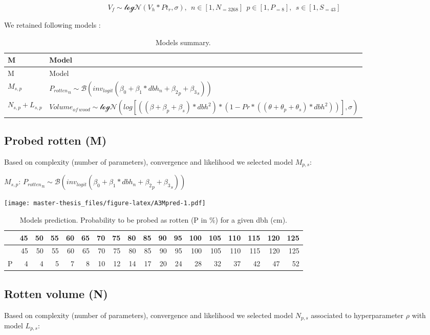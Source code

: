 \documentclass[12pt,]{article}
\theoremstyle{definition}
\theoremstyle{definition}
\theoremstyle{remark}
\begin{document}
\[V_f \sim \mathcal{logN}(V_h*Pt_r, \sigma), ~~n \in [1,N_{=3268}] ~~ p \in [1, P_{=8}], ~~ s \in [1, S_{=43}]\]

We retained following models :

\begin{longtable}[]{@{}ll@{}}
\caption{\label{tab:A3models}Models summary.}\tabularnewline
\toprule
M & Model\tabularnewline
\midrule
\endfirsthead
\toprule
M & Model\tabularnewline
\midrule
\endhead
\(M_{s,p}\) &
\({P_{rotten}}_n \sim \mathcal{B}(inv_{logit}(\beta_0 + \beta_1*dbh_n + {\beta_2}_p + {\beta_3}_s))\)\tabularnewline
\(N_{s,p} + L_{s,p}\) &
\(Volume_{of~wood} \sim \mathcal{logN} (log[((\beta + \beta_p + \beta_s)*dbh^2)*(1 - Pr*((\theta + \theta_p + \theta_s) *dbh^2))], \sigma)\)\tabularnewline
\bottomrule
\end{longtable}

\subsection{Probed rotten (M)}\label{probed-rotten-m}

Based on complexity (number of parameters), convergence and likelihood
we selected model \(M_{p,s}\):

\(M_{s,p}\):
\({P_{rotten}}_n \sim \mathcal{B}(inv_{logit}(\beta_0 + \beta_1*dbh_n + {\beta_2}_p + {\beta_3}_s))\)

\texttt{[image: master-thesis\_files/figure-latex/A3Mpred-1.pdf]}

\begin{longtable}[]{@{}lrrrrrrrrrrrrrrrrr@{}}
\caption{\label{tab:A3Mtab}Models prediction. Probability to be probed as
rotten (P in \%) for a given dbh (cm).}\tabularnewline
\toprule
& 45 & 50 & 55 & 60 & 65 & 70 & 75 & 80 & 85 & 90 & 95 & 100 & 105 & 110
& 115 & 120 & 125\tabularnewline
\midrule
\endfirsthead
\toprule
& 45 & 50 & 55 & 60 & 65 & 70 & 75 & 80 & 85 & 90 & 95 & 100 & 105 & 110
& 115 & 120 & 125\tabularnewline
\midrule
\endhead
P & 4 & 4 & 5 & 7 & 8 & 10 & 12 & 14 & 17 & 20 & 24 & 28 & 32 & 37 & 42
& 47 & 52\tabularnewline
\bottomrule
\end{longtable}

\subsection{Rotten volume (N)}\label{rotten-volume-n}

Based on complexity (number of parameters), convergence and likelihood
we selected model \(N_{p,s}\) associated to hyperparameter \(\rho\) with
model \(L_{p,s}\):
\end{document}
